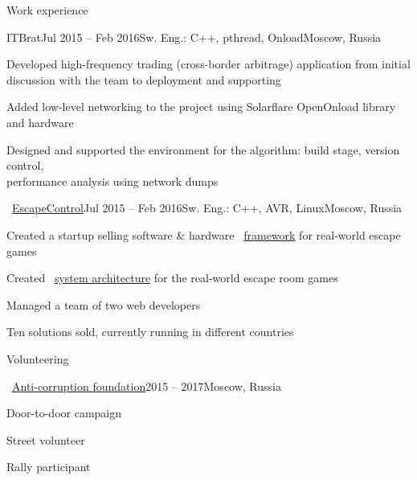 \documentclass{resume} %
\begin{document}
\begin{rSection}{Work experience}
\begin{rSubsection}{ITBrat}{Jul 2015 -- Feb 2016}{Sw. Eng.: C++, pthread, Onload}{Moscow, Russia}
	\item Developed high-frequency trading (cross-border arbitrage) application from initial discussion with the team to deployment and supporting
	\item Added low-level networking to the project using Solarflare OpenOnload library and hardware
	\item Designed and supported the environment for the algorithm: build stage, version control,\\ performance analysis using network dumps
\end{rSubsection}
	
\begin{rSubsection}{\faExternalLink~\href{http://escapecontrol.ru/index_en.html}{EscapeControl}}{Jul 2015 -- Feb 2016}{Sw. Eng.: C++, AVR, Linux}{Moscow, Russia}
	\item Created a startup selling software \& hardware \faExternalLink~\href{http://demo:demo@ec3.pagekite.escapecontrol.ru}{framework} for real-world escape games
	\item Created \faExternalLink~\href{http://habr.ru/p/258585/}{system architecture} for the real-world escape room games
	\item Managed a team of two web developers
	\item Ten solutions sold, currently running in different countries
\end{rSubsection}
		
\end{rSection}

\begin{rSection}{Volunteering}
	\begin{rSubsection}{\faExternalLink~\href{https://fbk.info/english/about/}{Anti-corruption foundation}}{2015 -- 2017}{Moscow, Russia}{}
		\item Door-to-door campaign
		\item Street volunteer
		\item Rally participant
	\end{rSubsection}
\end{rSection}

\end{document}
